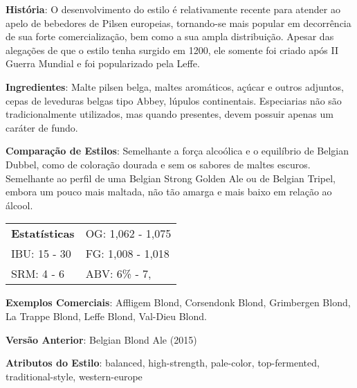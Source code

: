 \textbf{História}: O desenvolvimento do estilo é relativamente recente para atender ao apelo de bebedores de Pilsen europeias, tornando-se mais popular em decorrência de sua forte comercialização, bem como a sua ampla distribuição. Apesar das alegações de que o estilo tenha surgido em 1200, ele somente foi criado após II Guerra Mundial e foi popularizado pela Leffe.

\textbf{Ingredientes}: Malte pilsen belga, maltes aromáticos, açúcar e outros adjuntos, cepas de leveduras belgas tipo Abbey, lúpulos continentais. Especiarias não são tradicionalmente utilizados, mas quando presentes, devem possuir apenas um caráter de fundo.

\textbf{Comparação de Estilos}: Semelhante a força alcoólica e o equilíbrio de Belgian Dubbel, como de coloração dourada e sem os sabores de maltes escuros. Semelhante ao perfil de uma Belgian Strong Golden Ale ou de Belgian Tripel, embora um pouco mais maltada, não tão amarga e mais baixo em relação ao álcool.

\begin{tabular}{@{}p{35mm}p{35mm}@{}}
  \textbf{Estatísticas} & OG: 1,062 - 1,075 \\
  IBU: 15 - 30  & FG: 1,008 - 1,018  \\
  SRM: 4 - 6  & ABV: 6\% - 7,\5%
\end{tabular}

\textbf{Exemplos Comerciais}: Affligem Blond, Corsendonk Blond, Grimbergen Blond, La Trappe Blond, Leffe Blond, Val-Dieu Blond.

\textbf{Versão Anterior}: Belgian Blond Ale (2015)

\textbf{Atributos do Estilo}: balanced, high-strength, pale-color, top-fermented, traditional-style, western-europe
